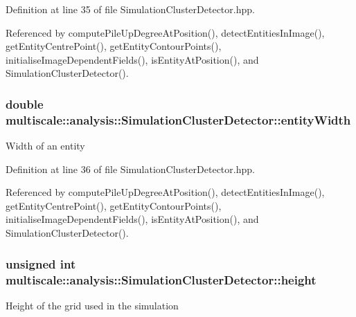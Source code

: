 Definition at line 35 of file Simulation\-Cluster\-Detector.\-hpp.



Referenced by compute\-Pile\-Up\-Degree\-At\-Position(), detect\-Entities\-In\-Image(), get\-Entity\-Centre\-Point(), get\-Entity\-Contour\-Points(), initialise\-Image\-Dependent\-Fields(), is\-Entity\-At\-Position(), and Simulation\-Cluster\-Detector().

\hypertarget{classmultiscale_1_1analysis_1_1SimulationClusterDetector_a9212da88b787b8f9791f27d913b6d05d}{
\subsubsection[{entity\-Width}]{\setlength{\rightskip}{0pt plus 5cm}double multiscale\-::analysis\-::\-Simulation\-Cluster\-Detector\-::entity\-Width\hspace{0.3cm}{\ttfamily [private]}}}\label{classmultiscale_1_1analysis_1_1SimulationClusterDetector_a9212da88b787b8f9791f27d913b6d05d}
Width of an entity 

Definition at line 36 of file Simulation\-Cluster\-Detector.\-hpp.



Referenced by compute\-Pile\-Up\-Degree\-At\-Position(), detect\-Entities\-In\-Image(), get\-Entity\-Centre\-Point(), get\-Entity\-Contour\-Points(), initialise\-Image\-Dependent\-Fields(), is\-Entity\-At\-Position(), and Simulation\-Cluster\-Detector().

\hypertarget{classmultiscale_1_1analysis_1_1SimulationClusterDetector_a9d0a0fe5d9ea0f2516d07bf44b1da257}{
\subsubsection[{height}]{\setlength{\rightskip}{0pt plus 5cm}unsigned int multiscale\-::analysis\-::\-Simulation\-Cluster\-Detector\-::height\hspace{0.3cm}{\ttfamily [private]}}}\label{classmultiscale_1_1analysis_1_1SimulationClusterDetector_a9d0a0fe5d9ea0f2516d07bf44b1da257}
Height of the grid used in the simulation 

